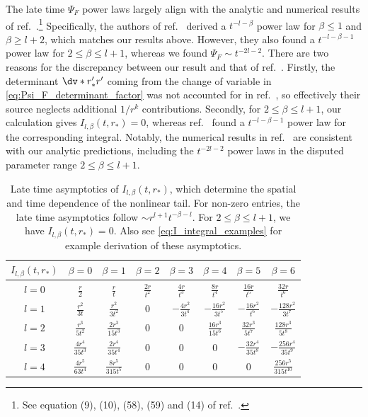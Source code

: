 The late time $\Psi_F$ power laws largely align with the analytic and numerical results of ref.~\cite{Cardoso:2024jme}.\footnote{See equation (9), (10), (58), (59) and (14) of ref.~\cite{Cardoso:2024jme}.}
Specifically, the authors of ref.~\cite{Cardoso:2024jme} derived a $t^{-l-\beta}$ power law for $\beta \leq 1$ and $\beta \geq l+2$, which matches our results above.
However, they also found a $t^{-l-\beta-1}$ power law for $2 \leq \beta \leq l+1$, whereas we found $\Psi_F \sim t^{-2l-2}$.
There are two reasons for the discrepancy between our result and that of ref.~\cite{Cardoso:2024jme}.
Firstly, the determinant $\dv*{r_*'}{r'}$ coming from the change of variable in \eqref{eq:Psi_F_determinant_factor} was not accounted for in ref.~\cite{Cardoso:2024jme}, so effectively their source neglects additional $1/r^k$ contributions.
Secondly, for $2 \leq \beta \leq l+1$, our calculation gives $I_{l,\beta}(t,r_*) = 0$, whereas ref.~\cite{Cardoso:2024jme} found a $t^{-l-\beta-1}$ power law for the corresponding integral.
Notably, the numerical results in ref.~\cite{Cardoso:2024jme} are consistent with our analytic predictions, including the $t^{-2l-2}$ power laws in the disputed parameter range $2 \leq \beta \leq l+1$.



\renewcommand{\arraystretch}{1.5}
\begin{table}[t]
  \centering
  \begin{tabular}{|c|c|c|c|c|c|c|c|}
    \hline
    $I_{l,\beta}(t,r_*)$ & $\beta=0$ & $\beta=1$ & $\beta=2$ & $\beta=3$ & $\beta=4$ & $\beta=5$ & $\beta=6$ \\
    \hline
    $l=0$&$\frac{r}{2}$&$\frac{r}{t}$&$\frac{2 r}{t^2}$&$\frac{4 r}{t^3}$&$\frac{8 r}{t^4}$&$\frac{16 r}{t^5}$&$\frac{32 r}{t^6}$\\$l=1$&$\frac{r^2}{3 t}$&$\frac{r^2}{3 t^2}$&$0$&$-\frac{4 r^2}{3 t^4}$&$-\frac{16 r^2}{3 t^5}$&$-\frac{16 r^2}{t^6}$&$-\frac{128 r^2}{3 t^7}$\\$l=2$&$\frac{r^3}{5 t^2}$&$\frac{2 r^3}{15 t^3}$&$0$&$0$&$\frac{16 r^3}{15 t^6}$&$\frac{32 r^3}{5 t^7}$&$\frac{128 r^3}{5 t^8}$\\$l=3$&$\frac{4 r^4}{35 t^3}$&$\frac{2 r^4}{35 t^4}$&$0$&$0$&$0$&$-\frac{32 r^4}{35 t^8}$&$-\frac{256 r^4}{35 t^9}$\\$l=4$&$\frac{4 r^5}{63 t^4}$&$\frac{8 r^5}{315 t^5}$&$0$&$0$&$0$&$0$&$\frac{256 r^5}{315 t^{10}}$ \\
    \hline
  \end{tabular}
  \caption{Late time asymptotics of $I_{l,\beta}(t,r_*)$, which determine the spatial and time dependence of the nonlinear tail.
    For non-zero entries, the late time asymptotics follow $\sim r^{l+1} t^{-\beta-l}$.
    For $2 \leq \beta \leq l+1$, we have $I_{l,\beta}(t,r_*) = 0$.
    Also see \eqref{eq:I_integral_examples} for example derivation of these asymptotics.}
  \label{tab:nonlinear_tail_amplitudes}
\end{table}


